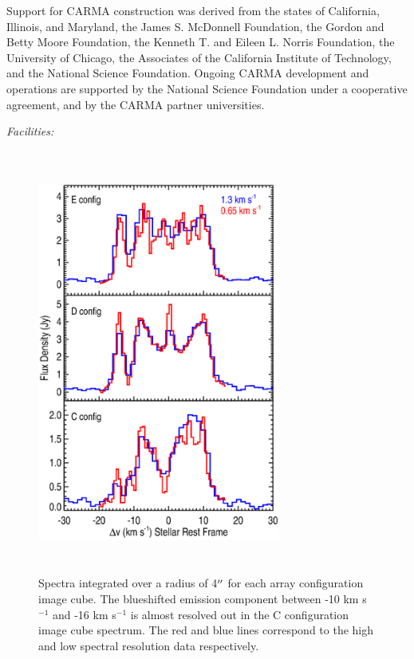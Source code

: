 \documentclass[preprint2]{aastex}
\begin{document}
\acknowledgments

Support for CARMA construction was derived from the states of California, Illinois, and
Maryland, the James S. McDonnell Foundation, the Gordon and Betty Moore Foundation, the
Kenneth T. and Eileen L. Norris Foundation, the University of Chicago, the Associates of the
California Institute of Technology, and the National Science Foundation. Ongoing CARMA
development and operations are supported by the National Science Foundation under a
cooperative agreement, and by the CARMA partner universities.

{\it Facilities:} 



\clearpage
\begin{figure}
\includegraphics[trim=80pt 60pt 10pt 50pt, clip, width=8.0cm, height=14.0cm]{f1.eps}
\caption{Spectra integrated over a radius of 4$\mbox{$^{\prime\prime}$}$ for each array configuration image cube. The blueshifted emission component between -10 km s${}^{-1}$ and -16 km s${}^{-1}$ is almost resolved out in the C configuration image cube spectrum. The red and blue lines correspond to the high and low spectral resolution data respectively.\label{fig1}}
\label{fig:fig1}
\end{figure}
\end{document}
